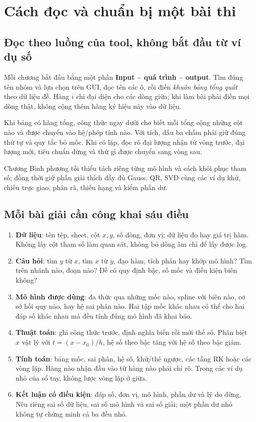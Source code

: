 \chapter*{Cách đọc và chuẩn bị một bài thi}

\section*{Đọc theo luồng của tool, không bắt đầu từ ví dụ số}
Mỗi chương bắt đầu bằng một phần \textbf{Input -- quá trình -- output}. Tìm đúng tên nhóm và lựa chọn trên GUI, đọc tên các ô, rồi điền \emph{khuôn bảng tổng quát} theo dữ liệu đề. Hàng $i$ chỉ đại diện cho các dòng giữa; khi làm bài phải điền mọi dòng thật, không cộng thêm hàng ký hiệu này vào dữ liệu.

Khi bảng có hàng tổng, công thức ngay dưới cho biết mỗi tổng cộng những cột nào và được chuyển vào hệ/phép tính nào. Với tích, dấu ba chấm phải giữ đúng thứ tự và quy tắc bỏ mốc. Khi có lặp, đọc rõ đại lượng nhận từ vòng trước, đại lượng mới, tiêu chuẩn dừng và thứ gì được chuyển sang vòng sau.

Chương Bình phương tối thiểu tách riêng từng mô hình và cách khôi phục tham số; đồng thời giữ phần giải thích đầy đủ Gauss, QR, SVD cùng các ví dụ khử, chiếu trực giao, phân rã, thiếu hạng và kiểm phần dư.

\section*{Mỗi bài giải cần công khai sáu điều}
\begin{enumerate}
\item \textbf{Dữ liệu}: tên tệp, sheet, cột $x,y$, số dòng, đơn vị; dữ liệu đo hay giá trị hàm. Không lấy cột tham số làm quan sát, không bỏ dòng âm chỉ để lấy được log.
\item \textbf{Câu hỏi}: tìm $y$ từ $x$, tìm $x$ từ $y$, đạo hàm, tích phân hay khớp mô hình? Tìm trên nhánh nào, đoạn nào? Đề có quy định bậc, số mốc và điều kiện biên không?
\item \textbf{Mô hình được dùng}: đa thức qua những mốc nào, spline với biên nào, cơ sở hồi quy nào, hay hệ sai phân nào. Hai tập mốc khác nhau có thể cho hai đáp số khác nhau mà đều tính đúng mô hình đã khai báo.
\item \textbf{Thuật toán}: ghi công thức trước, định nghĩa biến rồi mới thế số. Phân biệt $x$ vật lý với $t=(x-x_0)/h$, hệ số theo bậc tăng với hệ số theo bậc giảm.
\item \textbf{Tính toán}: bảng mốc, sai phân, hệ số, khử/thế ngược, các tầng RK hoặc các vòng lặp. Hàng nào nhận đầu vào từ hàng nào phải chỉ rõ. Trong các ví dụ nhỏ của sổ tay, không lược vòng lặp ở giữa.
\item \textbf{Kết luận có điều kiện}: đáp số, đơn vị, mô hình, phần dư và lý do dừng. Nêu riêng sai số dữ liệu, sai số mô hình và sai số giải; một phần dư nhỏ không tự chứng minh cả ba đều nhỏ.
\end{enumerate}

